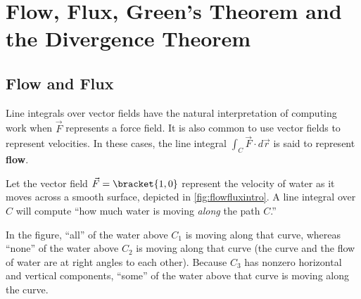 \section{Flow, Flux, Green's Theorem and the Divergence Theorem}\label{sec:greensthm}

\subsection{Flow and Flux}


Line integrals over vector fields have the natural interpretation of computing work when $\vec F$ represents a force field. It is also common to use vector fields to represent velocities. In these cases, the line integral $\int_C \vec F\cdot d\vec r$ is said to represent \textbf{flow}.

Let the vector field $\vec F=\bracket{1,0}$ represent the velocity of water as it moves across a smooth surface, depicted in \autoref{fig:flowfluxintro}. A line integral over $C$ will compute ``how much water is moving \emph{along} the path $C$.'' 

In the figure, ``all'' of the water above $C_1$ is moving along that curve, whereas ``none'' of the water above $C_2$ is moving along that curve (the curve and the flow of water are at right angles to each other). Because $C_3$ has nonzero horizontal and vertical components, ``some'' of the water above that curve is moving along the curve.

